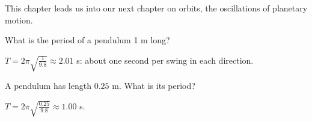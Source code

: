 This chapter leads us into our next chapter on orbits, the oscillations of planetary motion.

\begin{Worked}
\begin{Problem}
What is the period of a pendulum 1 m long?
\end{Problem}
\begin{Solution}
$T = 2\pi\sqrt{\frac{1}{9.8}} \approx 2.01$ s: about one
second per swing in each direction.
\end{Solution}
\end{Worked}

\begin{Exercise}[title={Shorter Pendulum}, label=pend3]
A pendulum has length $0.25$ m. What is its period?
\end{Exercise}
\begin{Answer}[ref=pend3]
$T = 2\pi\sqrt{\frac{0.25}{9.8}} \approx 1.00$ s.
\end{Answer}
